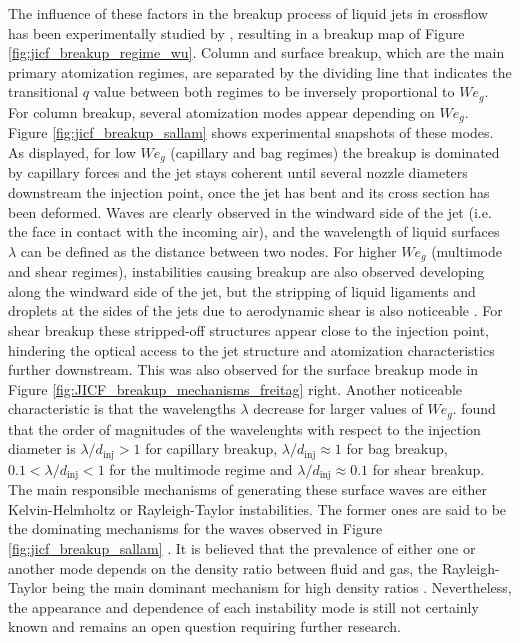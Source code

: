 The influence of these factors in the breakup process of liquid jets in crossflow has been experimentally studied by \citeColor[wu_breakup_1997], resulting in a breakup map of Figure \ref{fig:jicf_breakup_regime_wu}. Column and surface breakup, which are the main primary atomization regimes, are separated by the dividing line that indicates the transitional $q$ value between both regimes to be inversely proportional to $We_g$. For column breakup, several atomization modes appear depending on $We_g$. Figure \ref{fig:jicf_breakup_sallam} shows experimental snapshots of these modes. As displayed, for low $We_g$ (capillary and bag regimes) the breakup is dominated by capillary forces and the jet stays coherent until several nozzle diameters downstream the injection point, once the jet has bent and its cross section has been deformed. Waves are clearly observed in the windward side of the jet (i.e. the face in contact with the incoming air), and the wavelength of liquid surfaces $\lambda$ can be defined as the distance between two nodes.  For higher $We_g$ (multimode and shear regimes), instabilities causing breakup are also observed developing along the windward side of the jet, but the stripping of liquid ligaments and droplets at the sides of the jets due to aerodynamic shear is also noticeable . For shear breakup these stripped-off structures appear close to the injection point, hindering the optical access to the jet structure and atomization characteristics further downstream. This was also observed for the surface breakup mode in Figure \ref{fig:JICF_breakup_mechanisms_freitag} right. Another noticeable characteristic is that the wavelengths $\lambda$ decrease for larger values of $We_g$.  found that the order of magnitudes of the wavelenghts with respect to the injection diameter is $\lambda/d_\mathrm{inj} > 1$ for capillary breakup, $\lambda/d_\mathrm{inj} \approx 1$ for bag breakup, $0.1 < \lambda/d_\mathrm{inj} < 1$ for the multimode regime and $\lambda/d_\mathrm{inj} \approx 0.1$ for shear breakup. The main responsible mechanisms of generating these surface waves are either Kelvin-Helmholtz or Rayleigh-Taylor instabilities. The former ones are said to be the dominating mechanisms for the waves observed in Figure \ref{fig:jicf_breakup_sallam} . It is believed that the prevalence of either one or another mode depends on the density ratio between fluid and gas, the Rayleigh-Taylor  being the main dominant mechanism for high density ratios . Nevertheless, the appearance and dependence of each instability mode is still not certainly known and remains an open question requiring further research.

